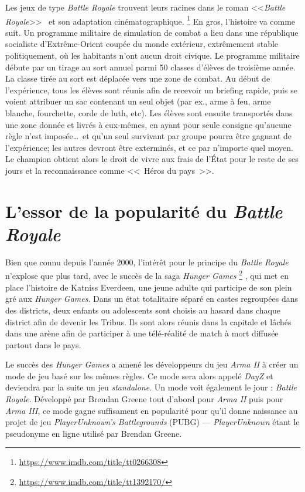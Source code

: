 Les jeux de type \emph{Battle Royale} trouvent leurs racines dans le roman <<\emph{Battle Royale}>>~\cite{takami2003battle} et son adaptation cinématographique.%
%
\footnote{\url{https://www.imdb.com/title/tt0266308}}
%
En gros, l'histoire va comme suit.
Un programme militaire de simulation de combat a lieu dans une république socialiste d'Extrême-Orient coupée du monde extérieur, extrêmement stable politiquement, o\`u les habitants n'ont aucun droit civique. Le programme militaire d\'ebute par un tirage au sort annuel parmi 50 classes d'élèves de troisième année. La classe tirée au sort est déplacée vers une zone de combat. Au début de l'expérience, tous les élèves sont réunis afin de recevoir un briefing rapide, puis se voient attribuer un sac contenant un seul objet (par ex., arme à feu, arme blanche, fourchette, corde de luth, etc). Les \'el\`eves sont ensuite transport\'es dans une zone donnée et livrés à eux-mêmes, en ayant pour seule consigne qu'aucune règle n'est imposée\ldots\ et qu'un seul survivant par groupe pourra être gagnant de l'expérience;  les autres devront être exterminés, et ce par n'importe quel moyen. Le champion obtient alors le droit de vivre aux frais de l'État pour le reste de ses jours et la reconnaissance comme <<~Héros du pays~>>.

\section{L'essor de la popularité du \emph{Battle Royale}}
Bien que connu depuis l'ann\'ee 2000, l'intérêt pour le principe du \emph{Battle Royale} n'explose que plus tard, avec le succès de la saga \emph{Hunger Games}%
%
\footnote{\url{https://www.imdb.com/title/tt1392170/}}
%
, qui met en place l'histoire de Katniss Everdeen, une jeune adulte qui participe de son plein gré aux \emph{Hunger Games}. Dans un état totalitaire séparé en castes regroupées dans des districts, deux enfants ou adolescents sont choisis au hasard dans chaque district afin de devenir les Tribus. Ils sont alors réunis dans la capitale et lâchés dans une arène afin de participer à une télé-réalité de match à mort diffusée partout dans le pays.

Le succès des \emph{Hunger Games} a amené les développeurs du jeu \emph{Arma II} à créer un mode de jeu basé sur les mêmes règles. Ce mode sera alors appelé \emph{DayZ} et deviendra par la suite un jeu \emph{standalone}. Un mode voit également le jour : \emph{Battle Royale}. Développé par Brendan Greene tout d'abord pour \emph{Arma II} puis pour \emph{Arma III}, ce mode gagne suffisament en popularité pour qu'il donne naissance au projet de jeu \emph{PlayerUnknown's Battlegrounds} (PUBG) --- \emph{PlayerUnknown} étant le pseudonyme en ligne utilisé par Brendan Greene.

